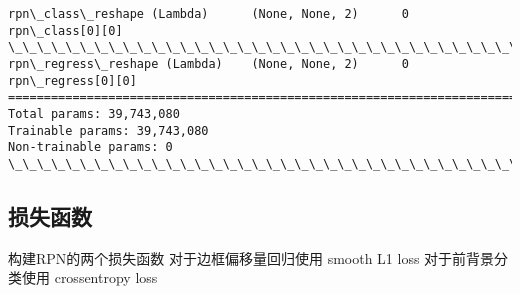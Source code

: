 \documentclass[11pt]{article}
\begin{document}
\begin{Verbatim}[commandchars=\\\{\}]
rpn\_class\_reshape (Lambda)      (None, None, 2)      0           rpn\_class[0][0]                  
\_\_\_\_\_\_\_\_\_\_\_\_\_\_\_\_\_\_\_\_\_\_\_\_\_\_\_\_\_\_\_\_\_\_\_\_\_\_\_\_\_\_\_\_\_\_\_\_\_\_\_\_\_\_\_\_\_\_\_\_\_\_\_\_\_\_\_\_\_\_\_\_\_\_\_\_\_\_\_\_\_\_\_\_\_\_\_\_\_\_\_\_\_\_\_\_\_\_
rpn\_regress\_reshape (Lambda)    (None, None, 2)      0           rpn\_regress[0][0]                
==================================================================================================
Total params: 39,743,080
Trainable params: 39,743,080
Non-trainable params: 0
\_\_\_\_\_\_\_\_\_\_\_\_\_\_\_\_\_\_\_\_\_\_\_\_\_\_\_\_\_\_\_\_\_\_\_\_\_\_\_\_\_\_\_\_\_\_\_\_\_\_\_\_\_\_\_\_\_\_\_\_\_\_\_\_\_\_\_\_\_\_\_\_\_\_\_\_\_\_\_\_\_\_\_\_\_\_\_\_\_\_\_\_\_\_\_\_\_\_

    \end{Verbatim}

    \hypertarget{ux635fux5931ux51fdux6570}{%
\subsection{损失函数}\label{ux635fux5931ux51fdux6570}}

    构建RPN的两个损失函数 对于边框偏移量回归使用 smooth L1 loss
对于前背景分类使用 crossentropy loss
\end{document}
